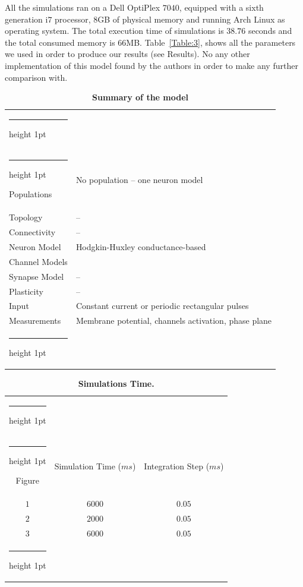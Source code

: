 \documentclass[10pt,a4paper,onecolumn]{article}
\makeatletter
\newcommand{\thickhline}{%
    \noalign {\ifnum 0=`}\fi \hrule height 1pt
    \futurelet \reserved@a \@xhline
}
\makeatother
\begin{document}
All the simulations ran on a Dell OptiPlex $7040$, equipped with a sixth
generation i$7$ processor, $8$GB of physical memory and running Arch Linux
as operating system. The total execution time of simulations is $38.76$
seconds and the total consumed memory is $66$MB. Table~\ref{Table:3}, shows
all the parameters we used in order to produce our results (see Results). 
No any other implementation of this model found by the authors in order 
to make any further comparison with.  
\begin{table}[!htbp]
    \centering
    \begin{tabular}{ll}
        \thickhline
        \multicolumn{2}{c}{Model Summary} \\\thickhline
        \rowcolor{Gray}
        Populations  & No population -- one neuron model \\\rowcolor{LightGray}
        Topology     & -- \\ \rowcolor{Gray}
        Connectivity & -- \\ \rowcolor{LightGray}
        Neuron Model & Hodgkin-Huxley conductance-based \\\rowcolor{Gray}
        Channel Models & \\ \rowcolor{LightGray}
        Synapse Model & -- \\ \rowcolor{Gray}
        Plasticity & -- \\ \rowcolor{LightGray}
        Input & Constant current or periodic rectangular pulses \\\rowcolor{Gray}
        Measurements & Membrane potential, channels activation, phase plane \\
        \thickhline
    \end{tabular}
    \caption{{\bfseries \sffamily Summary of the model}} 
    \label{Table:1}
\end{table}

\begin{table}[!htbp]
    \centering
    \begin{tabular}{ccc}
        \thickhline
        \multicolumn{3}{c}{Simulation Time} \\ \thickhline
        Figure & Simulation Time ($ms$) & Integration Step ($ms$) \\ \rowcolor{LightGray}
        $1$ & $6000$ & $0.05$ \\ \rowcolor{Gray}
        $2$ & $2000$ & $0.05$ \\ \rowcolor{LightGray} 
        $3$ & $6000$ & $0.05$  \\ \thickhline
    \end{tabular}
    \caption{{\bfseries \sffamily Simulations Time.}}
    \label{Table:2}
\end{table}
\end{document}
